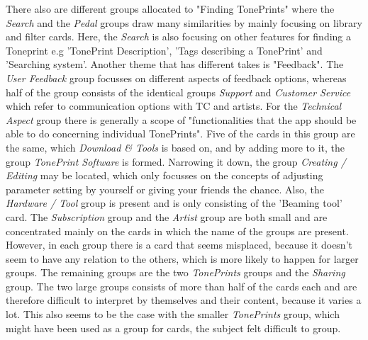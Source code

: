 \noindent
There also are different groups allocated to "Finding TonePrints" where the \textit{Search} and the \textit{Pedal} groups draw many similarities by mainly focusing on library and filter cards. Here, the \textit{Search} is also focusing on other features for finding a Toneprint e.g 'TonePrint Description', 'Tags describing a TonePrint' and 'Searching system'. Another theme that has different takes is "Feedback". The \textit{User Feedback} group focusses on different aspects of feedback options, whereas half of the group consists of the identical groups \textit{Support} and \textit{Customer Service} which refer to communication options with TC and artists. For the \textit{Technical Aspect} group there is generally a scope of "functionalities that the app should be able to do concerning individual TonePrints". Five of the cards in this group are the same, which \textit{Download \& Tools} is based on, and by adding more to it, the group \textit{TonePrint Software} is formed. Narrowing it down, the group \textit{Creating / Editing} may be located, which only focusses on the concepts of adjusting parameter setting by yourself or giving your friends the chance. Also, the \textit{Hardware / Tool} group is present and is only consisting of the 'Beaming tool' card. The \textit{Subscription} group and the \textit{Artist} group are both small and are concentrated mainly on the cards in which the name of the groups are present. However, in each group there is a card that seems misplaced, because it doesn't seem to have any relation to the others, which is more likely to happen for larger groups. The remaining groups are the two \textit{TonePrints} groups and the \textit{Sharing} group. The two large groups consists of more than half of the cards each and are therefore difficult to interpret by themselves and their content, because it varies a lot. This also seems to be the case with the smaller \textit{TonePrints} group, which might have been used as a group for cards, the subject felt difficult to group. \\

